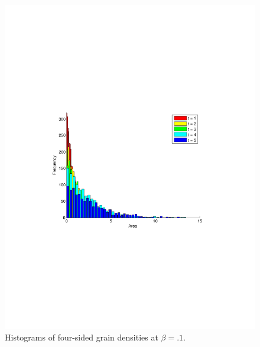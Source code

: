 \begin{figure}
\includegraphics[width=\textwidth]{histbetatenthtier4.pdf}
\vspace{-130pt}
\caption{Histograms of four-sided grain densities at $\beta = .1$.}
\end{figure}

